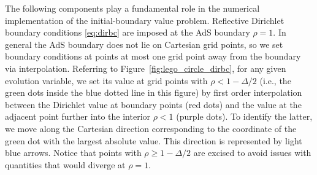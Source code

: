 \documentclass[a4paper,11pt]{article}
\numberwithin{equation}{section}
\begin{document}
The following components play a fundamental role in the numerical implementation of the initial-boundary value problem.
Reflective Dirichlet boundary conditions \eqref{eq:dirbc} are imposed at the AdS boundary $\rho=1$.
In general the AdS boundary does not lie on Cartesian grid points, so we set boundary conditions at points at most one grid point away from the boundary via interpolation. Referring to Figure~\ref{fig:lego_circle_dirbc}, for any given evolution variable, we set its value at grid points with $\rho<1-\Delta/2$ (i.e., the green dots inside the blue dotted line in this figure) by first order interpolation between the Dirichlet value at boundary points (red dots) and the value at the adjacent point further into the interior $\rho<1$ (purple dots). To identify the latter, we move along the Cartesian direction corresponding to the coordinate of the green dot with the largest absolute value. This direction is represented by light blue arrows. Notice that points with $\rho\geq1-\Delta/2$ are excised to avoid issues with quantities that would diverge 
at $\rho=1$.
\end{document}
